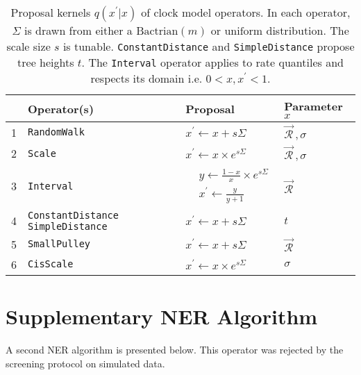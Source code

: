 \documentclass[12pt]{article}
\begin{document}
\begin{table}[h!]
\centering
\begin{tabular}{l p{3cm} l l} 

 & Operator(s) & Proposal & Parameter $x$   \\
   \hline
 1 & \texttt{RandomWalk}  & $x^\prime \leftarrow x + s\Sigma$ & $\vec{\mathcal{R}}^{\,}, \sigma$  \\
  \hline
 2 & \texttt{Scale} & $x^\prime \leftarrow x \times e^{s\Sigma}$ & $\vec{\mathcal{R}}^{\,}, \sigma$   \\
  \hline
 3 & \texttt{Interval} & $\begin{array} {rl} &y \leftarrow \frac{1 - x}{x} \times e^{s\Sigma} \\ &x^\prime \leftarrow \frac{y}{y + 1}  \end{array}$ & $\vec{\mathcal{R}}^{\,}$  \\
  \hline
 4 & \texttt{ConstantDistance} \texttt{SimpleDistance} & $x^\prime \leftarrow x + s\Sigma$ & $t$ \\
 \hline
 5 & \texttt{SmallPulley} & $x^\prime \leftarrow x + s\Sigma$ & $\vec{\mathcal{R}}^{\,}$  \\
 \hline
6 & \texttt{CisScale}  & $x^\prime \leftarrow x \times e^{s\Sigma}$ & $\sigma$   \\
\end{tabular}
\caption{Proposal kernels $q(x^\prime|x)$ of clock model operators.
 In each operator, $\Sigma$ is drawn from either a $\text{Bactrian}(m)$ or $\text{uniform}$ distribution.  %
 The scale size $s$ is tunable.
 \texttt{ConstantDistance} and \texttt{SimpleDistance} propose tree heights $t$.
  The \texttt{Interval} operator applies to rate quantiles and respects its domain i.e. $0 < x, x^\prime < 1$. }
\label{table:bactriankernels}
\end{table}





\clearpage
\section{Supplementary NER Algorithm}

A second NER algorithm is presented below. This operator was rejected by the screening protocol on simulated data.
\end{document}
